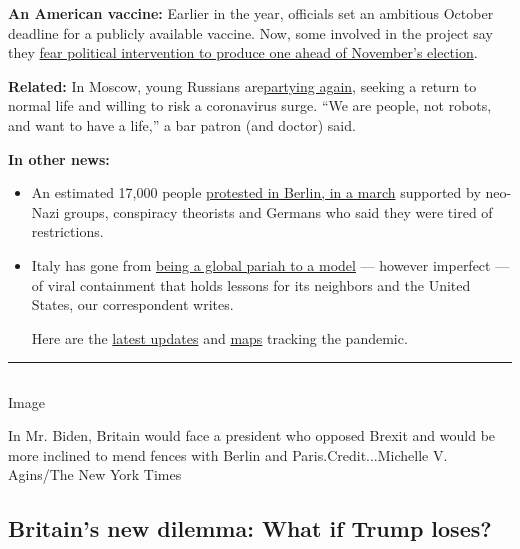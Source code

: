 \textbf{An American vaccine:} Earlier in the year, officials set an
ambitious October deadline for a publicly available vaccine. Now, some
involved in the project say they
\href{https://www.nytimes3xbfgragh.onion/2020/08/02/us/politics/coronavirus-vaccine.html}{fear
political intervention to produce one ahead of November's election}.

\textbf{Related:} In Moscow, young Russians
are\href{https://www.nytimes3xbfgragh.onion/2020/08/01/world/europe/russia-moscow-coronavirus.html}{partying
again}, seeking a return to normal life and willing to risk a
coronavirus surge. ``We are people, not robots, and want to have a
life,'' a bar patron (and doctor) said.

\textbf{In other news:}

\begin{itemize}
\item
  An estimated 17,000 people
  \href{https://www.nytimes3xbfgragh.onion/video/world/europe/100000007268465/coronavirus-protest-germany.html}{protested
  in Berlin, in a march} supported by neo-Nazi groups, conspiracy
  theorists and Germans who said they were tired of restrictions.
\item
  Italy has gone from
  \href{https://www.nytimes3xbfgragh.onion/2020/07/31/world/europe/italy-coronavirus-reopening.html}{being
  a global pariah to a model} --- however imperfect --- of viral
  containment that holds lessons for its neighbors and the United
  States, our correspondent writes.

  Here are the
  \href{https://www.nytimes3xbfgragh.onion/2020/08/02/world/coronavirus-covid-19.html}{latest
  updates} and
  \href{https://www.nytimes3xbfgragh.onion/interactive/2020/world/coronavirus-maps.html}{maps}
  tracking the pandemic.
\end{itemize}

\begin{center}\rule{0.5\linewidth}{\linethickness}\end{center}

\subsection{}

Image

In Mr. Biden, Britain would face a president who opposed Brexit and
would be more inclined to mend fences with Berlin and
Paris.Credit...Michelle V. Agins/The New York Times

\hypertarget{britains-new-dilemma-what-if-trump-loses}{%
\subsection{Britain's new dilemma: What if Trump
loses?}\label{britains-new-dilemma-what-if-trump-loses}}

